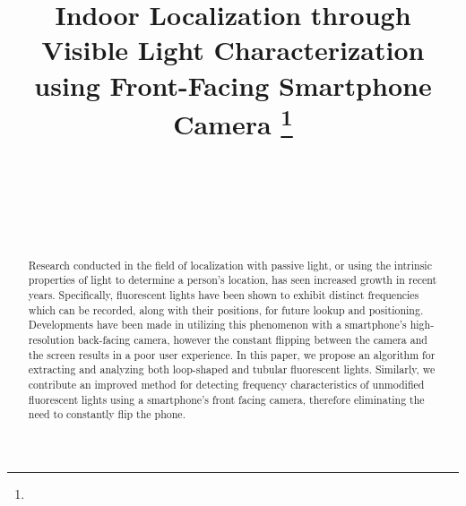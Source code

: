 \documentclass[conference]{IEEEtran}
\begin{document}
\title{Indoor Localization through Visible Light Characterization using Front-Facing Smartphone Camera
\thanks{}
}
\author{
\\
\and
{}
\\
\and
{}
\\
}
\maketitle

\begin{abstract}
Research conducted in the field of localization with passive light, or using the intrinsic properties of light to determine a person's location, has seen increased growth in recent years. Specifically, fluorescent lights have been shown to exhibit distinct frequencies which can be recorded, along with their positions, for future lookup and positioning. Developments have been made in utilizing this phenomenon with a smartphone's high-resolution back-facing camera, however the constant flipping between the camera and the screen results in a poor user experience. In this paper, we propose an algorithm for extracting and analyzing both loop-shaped and tubular fluorescent lights. Similarly, we contribute an improved method for detecting frequency characteristics of unmodified fluorescent lights using a smartphone's front facing camera, therefore eliminating the need to constantly flip the phone.

\end{abstract}
\end{document}
